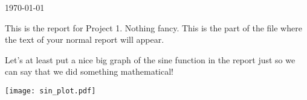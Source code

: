 \documentclass[11pt]{article}
\begin{document}
\today

\begin{report}
This is the report for Project 1. Nothing fancy. This is the part of the file where the text of your normal report will appear.

Let's at least put a nice big graph of the sine function in the report just so we can say that we did something mathematical!

\texttt{[image: sin\_plot.pdf]}

\end{report}
\end{document}
